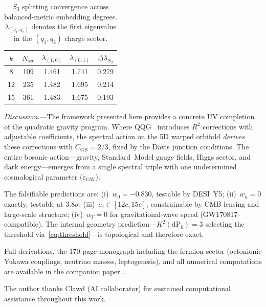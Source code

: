 \documentclass[aps,prl,twocolumn,superscriptaddress]{revtex4-2}
\newcommand{\CGB}{C_{\mathrm{GB}}}
\newcommand{\epsGW}{\varepsilon_{\mathrm{GW}}}
\newcommand{\dP}{\mathrm{dP}_6}
\begin{document}
\begin{table}[b]
\caption{$S_3$ splitting convergence across balanced-metric embedding
degrees.  $\lambda_{(q_1,q_2)}$ denotes the first eigenvalue in the
$(q_1, q_2)$ charge sector.}
\label{tab:splitting}
\begin{ruledtabular}
\begin{tabular}{ccccc}
$k$ & $N_{\text{sec}}$ & $\lambda_{(1,0)}$ & $\lambda_{(0,1)}$
& $\Delta\lambda_{S_3}$ \\
\hline
8  & 109 & 1.461 & 1.741 & 0.279 \\
12 & 235 & 1.482 & 1.695 & 0.214 \\
15 & 361 & 1.483 & 1.675 & 0.193 \\
\end{tabular}
\end{ruledtabular}
\end{table}



\textit{Discussion.}---The framework presented here provides a
concrete UV completion of the quadratic gravity program.  Where
QQG~\cite{Afshordi2026} introduces $R^2$ corrections with adjustable
coefficients, the spectral action on the 5D warped orbifold \emph{derives}
these corrections with $\CGB = 2/3$, fixed by the Davis junction conditions.
The entire bosonic action---gravity, Standard~Model gauge fields, Higgs
sector, and dark energy---emerges from a single spectral triple with one
undetermined cosmological parameter ($\epsGW$).

The falsifiable predictions are: (i)~$w_0 = -0.830$, testable by DESI~Y5;
(ii)~$w_a = 0$ exactly, testable at $3.8\sigma$; (iii)~$c_s \in [12c, 15c]$,
constrainable by CMB lensing and large-scale structure;
(iv)~$\alpha_T = 0$ for gravitational-wave speed (GW170817-compatible).
The internal geometry prediction---$K^2(\dP) = 3$ selecting the threshold
via~\eqref{eq:threshold}---is topological and therefore exact.

Full derivations, the 170-page monograph including the fermion sector
(octonionic Yukawa couplings, neutrino masses, leptogenesis), and all
numerical computations are available in the companion
paper~\cite{IgguldenSchnell2026}.

\begin{acknowledgments}
The author thanks Clawd (AI collaborator) for sustained computational
assistance throughout this work.
\end{acknowledgments}
\end{document}

